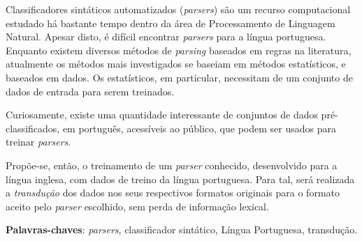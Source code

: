 \setlength{\absparsep}{18pt} %
\begin{resumo}

    Classificadores sintáticos automatizados (\textit{parsers}) são um recurso computacional estudado há bastante tempo dentro da área de Processamento de Linguagem Natural. Apesar disto, é difícil encontrar \textit{parsers} para a língua portuguesa. 
    Enquanto existem diversos métodos de \textit{parsing} baseados em regras na literatura, atualmente os métodos mais investigados se baseiam em métodos estatísticos, e baseados em dados. Os estatísticos, em particular, necessitam de um conjunto de dados de entrada para serem treinados.
    
     Curiosamente, existe uma quantidade interessante de conjuntos de dados pré-classificados, em português, acessíveis ao público, que podem ser usados para treinar \textit{parsers}.
    
    Propõe-se, então, o treinamento de um \textit{parser} conhecido, desenvolvido para a língua inglesa, com dados de treino da língua portuguesa. Para tal, será realizada a \textit{transdução} dos dados
    nos seus respectivos formatos originais para o formato aceito pelo \textit{parser} escolhido, sem perda de informação lexical.

 \textbf{Palavras-chaves}: \textit{parsers}, classificador sintático, Língua Portuguesa, transdução.
\end{resumo}